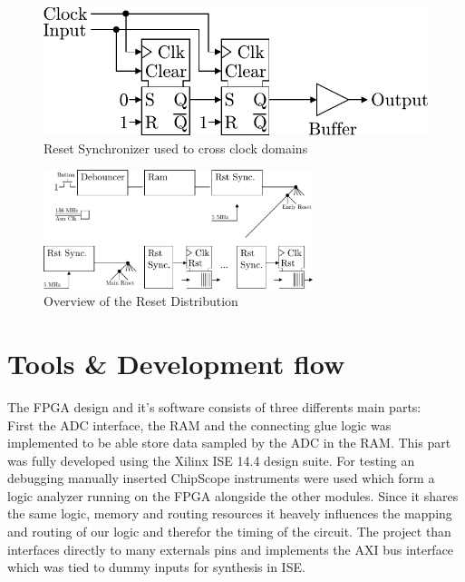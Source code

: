 \begin{figure}
  \centering
  \includegraphics{figures/RstSync}
  \caption{Reset Synchronizer used to cross clock domains}
  \label{fig:fpga_rst_sync}
\end{figure}

\begin{figure}
  \centering
  \includegraphics[width=0.7\textwidth]{figures/rst_generation}
  \caption{Overview of the Reset Distribution}
  \label{fig:fpga_rst_generation}
\end{figure}




\section{Tools \& Development flow}
\label{sec:fpga_tools}

The \gls{FPGA} design and it's software consists of three differents
main parts: \\

First the \gls{ADC} interface, the \gls{RAM} and the connecting
glue logic was implemented to be able store data sampled by the \gls{ADC}
in the \gls{RAM}. This part was fully developed using the Xilinx ISE 14.4
design suite. For testing an debugging manually inserted ChipScope
instruments were used which form a logic analyzer running on the \gls{FPGA}
alongside the other modules. Since it shares the same logic, memory and
routing resources it heavely influences the mapping and routing of our
logic and therefor the timing of the circuit. The project than interfaces
directly to many externals pins and implements the \gls{AXI} bus interface
which was tied to dummy inputs for synthesis in ISE. \\

